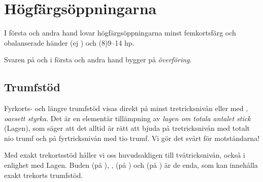 \chapter{H{\"o}gf{\"a}rgs{\"o}ppningarna}

I f\"orsta och andra hand lovar h{\"o}gf{\"a}rgs{\"o}ppningarna
minst femkortsfärg och obalanserade h{\"a}nder (ej )
och (8)9--14 hp.

Svaren p{\aa}  och  i f\"orsta och andra hand
bygger p{\aa} {\em {\"o}verf{\"o}ring}.

\section{Trumfst\"od}

Fyrkorts- och längre trumfstöd visas direkt på minst tretricksnivån eller
med , {\em
oavsett styrka}. Det är en elementär tillämpning av {\em lagen om totala
antalet stick} ({\sc Lagen}), som säger att det alltid är rätt att bjuda på
tretricksnivån med totalt nio trumf och på fyrtricksnivån med tio trumf.
Vi gör det svårt för motståndarna!


Med exakt trekortsstöd håller vi oss huvudsakligen till tvåtricksnivån, också i
enlighet med {\sc Lagen}. Buden  (på ), ,  (på
) och 
 (på ) är de enda, som kan innehålla exakt trekorts trumfstöd.

